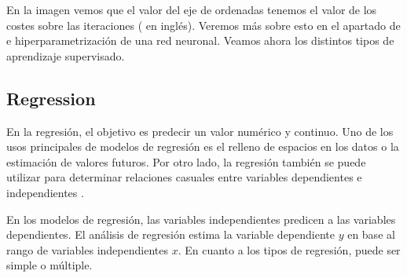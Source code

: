 En la imagen vemos que el valor del eje de ordenadas tenemos el valor de los costes sobre las iteraciones ( en inglés). Veremos más sobre esto en el apartado de  e hiperparametrización de una red neuronal. Veamos ahora los distintos tipos de aprendizaje supervisado.

\subsection{Regression}

En la regresión, el objetivo es predecir un valor numérico y continuo. Uno de los usos principales de modelos de regresión es el relleno de espacios en los datos o la estimación de valores futuros. Por otro lado, la regresión también se puede utilizar para determinar relaciones casuales entre variables dependientes e independientes .

En los modelos de regresión, las variables independientes predicen a las variables dependientes. El análisis de regresión estima la variable dependiente $y$ en base al rango de variables independientes $x$. En cuanto a los tipos de regresión, puede ser simple o múltiple.

